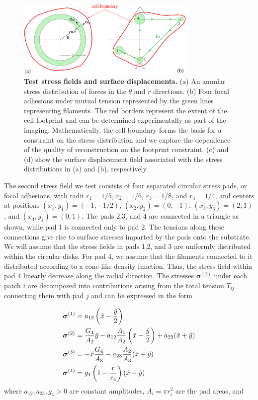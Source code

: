\documentclass[aps,prl,reprint,twocolumn,groupedaddress,showpacs]{revtex4-1}
\newcommand{\bsigma}{{\boldsymbol\sigma}}
\begin{document}
\begin{figure}[h!]
\begin{center}
%
\includegraphics[width=3.4in]{tests.pdf}
\caption{\textbf{Test stress fields and surface displacements.} (a) An
  annular stress distribution of forces in the $\theta$ and $r$
  directions. (b) Four focal adhesions under mutual tension
  represented by the green lines representing filaments. The red
  borders represent the extent of the cell footprint and can be
  determined experimentally as part of the imaging.  Mathematically,
  the cell boundary forms the basis for a constraint on the stress
  distribution and we explore the dependence of the quality of
  reconstruction on the footprint constraint. (c) and (d) show the
  surface displacement field associated with the stress distributions
  in (a) and (b), respectively.}
\label{TESTS}
\end{center}
\end{figure}
%

The second stress field we test consists of four separated circular
stress pads, or focal adhesions, with radii $r_{1} = 1/5$, $r_{2} =
1/6$, $r_{3} = 1/8$, and $r_{4} = 1/4$, and centers at positions
$(x_{1},y_{1}) = (-1,-1/2)$, $(x_{2},y_{2}) = (0,-1)$, $(x_{3},y_{3}) =
(2,1)$, and $(x_{4},y_{4}) = (0,1)$.  The pads 2,3, and 4 are
connected in a triangle as shown, while pad 1 is connected only to pad
2.  The tensions along these connections give rise to surface stresses
imparted by the pads onto the substrate.  We will assume that the
stress fields in pads 1,2, and 3 are uniformly distributed within the
circular disks. For pad 4, we assume that the filaments connected to
it distributed according to a cone-like density function. Thus, the
stress field within pad 4 linearly decrease along the radial
direction. The stresses $\bsigma^{(i)}$ under each patch $i$ are
decomposed into contributions arising from the total tension $T_{ij}$
connecting them with pad $j$ and can be expressed in the form

\begin{align}
\bsigma^{(1)} & = a_{12}\left(\hat{x} -{\hat{y}\over 2}\right) \label{SIGMA1}\\
\bsigma^{(2)} & = {G_{4}\over A_{2}}\hat{y} - a_{12}{A_{1}\over A_{2}}\left(\hat{x} 
-{\hat{y}\over 2}\right) + a_{23}(\hat{x}+\hat{y}) \label{SIGMA2} \\
\bsigma^{(3)} & = -\hat{x}{G_{4}\over A_{3}} - a_{23}{A_{2}\over A_{3}}(\hat{x}+\hat{y}) 
\label{SIGMA3}\\
\bsigma^{(4)} & = g_{4}\left(1- {r \over r_{4}}\right)(\hat{x}-\hat{y})
\end{align}
%
where $a_{12}, a_{23}, g_{4} >0$ are constant amplitudes, 
$A_{i} = \pi r_{i}^{2}$ are the pad areas, and 
\end{document}
